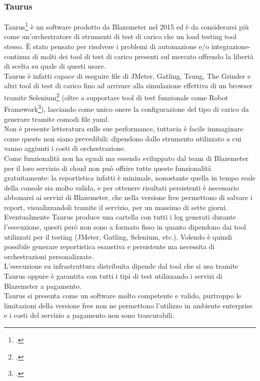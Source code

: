 \subsubsection{Taurus}
Taurus\footcite{site:taurus} è un software prodotto da Blazemeter nel 2015 ed è da considerarsi più come un'orchestratore di strumenti di test di carico che un load testing tool stesso. È stato pensato per risolvere i problemi di automazione e/o \gls{integrazione-continua} di molti dei tool di test di carico presenti sul mercato offrendo la libertà di scelta su quale di questi usare.\\
Taurus è infatti capace di eseguire file di JMeter, Gatling, Tsung, The Grinder e altri tool di test di carico fino ad arrivare alla simulazione effettiva di un browser tramite Selenium\footcite{site:selenium} (oltre a supportare tool di test funzionale come Robot Framework\footcite{site:robot}), lasciando come unico onere la configurazione del tipo di carico da generare tramite comodi file \gls{yaml}. \\
Non è presente letteratura sulle sue performance, tuttavia è facile immaginare come queste non siano prevedibili: dipendono dallo strumento utilizzato a cui vanno aggiunti i costi di orchestrazione. \\
Come funzionalità non ha eguali ma essendo sviluppato dal team di Blazemeter per il loro servizio di \gls{cloud} non può offrire tutte queste funzionalità gratuitamente: la reportistica infatti è minimale, nonostante quella in tempo reale della console sia molto valida, e per ottenere risultati persistenti è necessario abbonarsi ai servizi di Blazemeter, che nella versione free permettono di salvare i report, visualizzandoli tramite il servizio, per un massimo di sette giorni.
Eventualmente Taurus produce una cartella con tutti i log generati durante l'esecuzione, questi però non sono a formato fisso in quanto dipendono dai tool utilizzati per il testing (JMeter, Gatling, Selenium, etc.). Volendo è quindi possibile generare reportistica esaustiva e persistente ma necessita di orchestrazioni personalizzate. \\
L'esecuzione su infrastruttura distribuita dipende dal tool che si usa tramite Taurus oppure è garantita con tutti i tipi di test utilizzando i servizi di Blazemeter a pagamento. \\
Taurus si presenta come un software molto competente e valido, purtroppo le limitazioni della versione free non ne permettono l'utilizzo in ambiente enterprise e i costi del servizio a pagamento non sono trascurabili.
